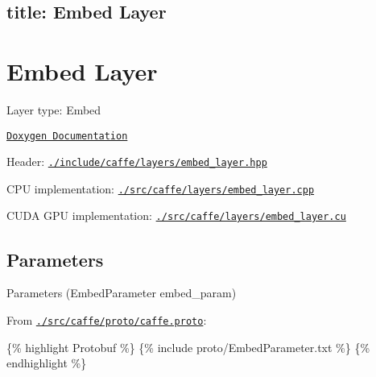 

 \subsection*{title\+: Embed Layer }

\section*{Embed Layer}


\begin{DoxyItemize}
\item Layer type\+: {\ttfamily Embed}
\item \href{http://caffe.berkeleyvision.org/doxygen/classcaffe_1_1EmbedLayer.html}{\tt Doxygen Documentation}
\item Header\+: \href{https://github.com/BVLC/caffe/blob/master/include/caffe/layers/embed_layer.hpp}{\tt {\ttfamily ./include/caffe/layers/embed\+\_\+layer.hpp}}
\item C\+PU implementation\+: \href{https://github.com/BVLC/caffe/blob/master/src/caffe/layers/embed_layer.cpp}{\tt {\ttfamily ./src/caffe/layers/embed\+\_\+layer.cpp}}
\item C\+U\+DA G\+PU implementation\+: \href{https://github.com/BVLC/caffe/blob/master/src/caffe/layers/embed_layer.cu}{\tt {\ttfamily ./src/caffe/layers/embed\+\_\+layer.cu}}
\end{DoxyItemize}

\subsection*{Parameters}


\begin{DoxyItemize}
\item Parameters ({\ttfamily Embed\+Parameter embed\+\_\+param})
\item From \href{https://github.com/BVLC/caffe/blob/master/src/caffe/proto/caffe.proto}{\tt {\ttfamily ./src/caffe/proto/caffe.proto}}\+:
\end{DoxyItemize}

\{\% highlight Protobuf \%\} \{\% include proto/\+Embed\+Parameter.\+txt \%\} \{\% endhighlight \%\} 